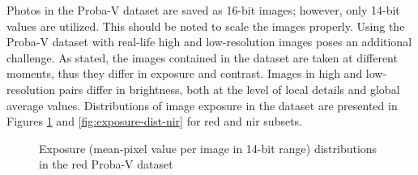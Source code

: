 Photos in the Proba-V dataset are saved as 16-bit images; however, only 14-bit values are utilized.
This should be noted to scale the images properly.
Using the Proba-V dataset with real-life high and low-resolution images poses an additional challenge.
As stated, the images contained in the dataset are taken at different moments, thus they differ in exposure and contrast.
Images in high and low-resolution pairs differ in brightness, both at the level of local details and global average values.
Distributions of image exposure in the dataset are presented in Figures \ref{fig:exposure-dist-red} and \ref{fig:exposure-dist-nir} for \gls{red} and \gls{nir} subsets.
\begin{figure}
        \centering
    \caption{Exposure (mean-pixel value per image in 14-bit range) distributions in the \gls{red} Proba-V dataset}
    \label{fig:exposure-dist-red}
\end{figure}
